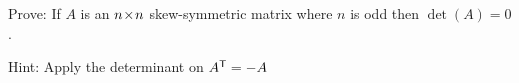 
\begin{Exercise}[
name={},
title={}, 
difficulty=0,
origin={\cite{YL}}]
Prove: If $A$ is an $n \! \times \! n$ skew-symmetric matrix where $n$ is odd then $\det(A)=0$.
\end{Exercise}

\begin{Answer}
Hint: Apply the determinant on ${{A}^{\mathsf{T}}}=-A$
\end{Answer}
